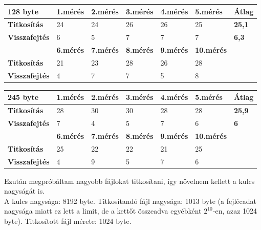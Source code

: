 \begin{center}
	
	
	\begin{tabular}{|p{2.4cm}|p{1.6cm}|p{1.6cm}|p{1.7cm}|p{1.7cm}|p{1.8cm}|p{1.5cm}|}
		\hline
		\textbf{128 byte} & \textbf{1.mérés} & \textbf{2.mérés} & \textbf{3.mérés} & \textbf{4.mérés} & \textbf{5.mérés} & \textbf{Átlag} \\
		\hline
		\textbf{Titkosítás}&24&24&26&26&25& \textbf{25,1} \\
		\hline
		\textbf{Visszafejtés}&6&5&7&7&7& \textbf{6,3} \\
		\hline
		& \textbf{6.mérés} & \textbf{7.mérés} & \textbf{8.mérés} & \textbf{9.mérés} & \textbf{10.mérés} & \\
		\hline
		\textbf{Titkosítás}&21&23&28&26&28 &\\
		\hline
		\textbf{Visszafejtés}&4&7&7&5&8&\\
		\hline
	\end{tabular}
\end{center}

\begin{center}
	
	
	\begin{tabular}{|p{2.4cm}|p{1.6cm}|p{1.6cm}|p{1.7cm}|p{1.7cm}|p{1.8cm}|p{1.5cm}|}
		\hline
		\textbf{245 byte} & \textbf{1.mérés} & \textbf{2.mérés} & \textbf{3.mérés} & \textbf{4.mérés} & \textbf{5.mérés} & \textbf{Átlag} \\
		\hline
		\textbf{Titkosítás}&28&30&30&28&28& \textbf{25,9} \\
		\hline
		\textbf{Visszafejtés}&7&4&5&7&6& \textbf{6} \\
		\hline
		& \textbf{6.mérés} & \textbf{7.mérés} & \textbf{8.mérés} & \textbf{9.mérés} & \textbf{10.mérés} & \\
		\hline
		\textbf{Titkosítás}&25&22&22&21&25&\\
		\hline
		\textbf{Visszafejtés}&4&9&5&7&6&\\
		\hline
	\end{tabular}
\end{center}
Ezután megpróbáltam nagyobb fájlokat titkosítani, így növelnem kellett a kulcs nagyságát is.
\vspace{5pt} \\ A kulcs nagysága: 8192 byte. Titkosítandó fájl nagysága: 1013 byte (a fejlécadat nagysága miatt ez lett a limit, de a kettőt összeadva egyébként $2^{10}$-en, azaz 1024 byte). Titkosított fájl mérete: 1024 byte.



